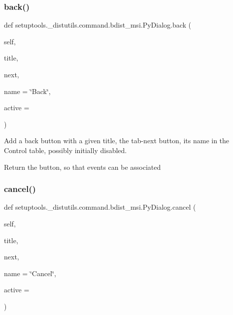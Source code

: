 \subsubsection{\texorpdfstring{back()}{back()}}
{\footnotesize\ttfamily def setuptools.\+\_\+distutils.\+command.\+bdist\+\_\+msi.\+Py\+Dialog.\+back (\begin{DoxyParamCaption}\item[{}]{self,  }\item[{}]{title,  }\item[{}]{next,  }\item[{}]{name = {\ttfamily \char`\"{}Back\char`\"{}},  }\item[{}]{active = {} }\end{DoxyParamCaption})}

\begin{DoxyVerb}Add a back button with a given title, the tab-next button,
its name in the Control table, possibly initially disabled.

Return the button, so that events can be associated\end{DoxyVerb}
 \mbox{\label{classsetuptools_1_1__distutils_1_1command_1_1bdist__msi_1_1PyDialog_a78cdce01f7544185cb934b0fe84ff078}} 
\subsubsection{\texorpdfstring{cancel()}{cancel()}}
{\footnotesize\ttfamily def setuptools.\+\_\+distutils.\+command.\+bdist\+\_\+msi.\+Py\+Dialog.\+cancel (\begin{DoxyParamCaption}\item[{}]{self,  }\item[{}]{title,  }\item[{}]{next,  }\item[{}]{name = {\ttfamily \char`\"{}Cancel\char`\"{}},  }\item[{}]{active = {} }\end{DoxyParamCaption})}

